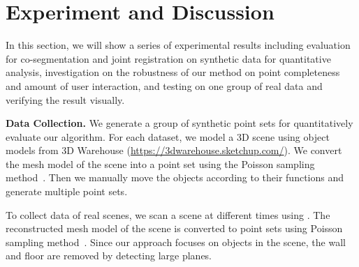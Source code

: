 \section{Experiment and Discussion}
\label{sec:results}
In this section, we will show a series of experimental results including evaluation for co-segmentation and joint registration on synthetic data for quantitative analysis, investigation on the robustness of our method on point completeness and amount of user interaction, and testing on one group of real data and verifying the result visually.

\noindent \textbf{Data Collection.} 
We generate a group of synthetic point sets for quantitatively evaluate our algorithm. 
%
For each dataset, we model a 3D scene using object models from 3D Warehouse (\url{https://3dwarehouse.sketchup.com/}).
We convert the mesh model of the scene into a point set using the Poisson sampling method~\cite{PossionSampling}.
%
Then we manually move the objects according to their functions and generate multiple point sets. 

To collect data of real scenes, we scan a scene at different times using \cite{VXH}.
%
The reconstructed mesh model of the scene is converted to point sets using Poisson sampling method~\cite{PossionSampling}.
% 
Since our approach focuses on objects in the scene, the wall and floor are removed by detecting large planes.

